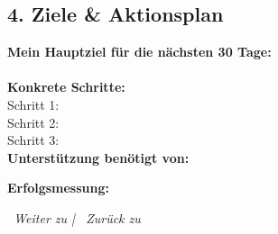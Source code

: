 \subsection*{\textcolor{ctmmOrange}{4. Ziele \& Aktionsplan}}

\textbf{Mein Hauptziel für die nächsten 30 Tage:}\\
\\

\textbf{Konkrete Schritte:}\\
Schritt 1: \\
Schritt 2: \\
Schritt 3: \\

\textbf{Unterstützung benötigt von:}\\

\textbf{Erfolgsmessung:}\\

\vspace{1cm}
\begin{center}
\textit{\textcolor{ctmmGreen}{\faChevronRight~Weiter zu}  | \textcolor{ctmmRed}{\faChevronLeft~Zurück zu} }
\end{center}
